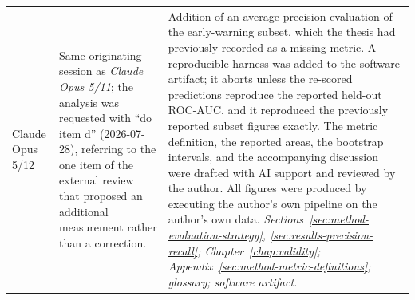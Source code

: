 {\begin{longtable}{p{} p{} p{}}
Claude Opus 5/12
& Same originating session as \emph{Claude Opus 5/11}; the analysis was requested with
``do item d'' (2026-07-28), referring to the one item of the external review that
proposed an additional measurement rather than a correction.
& Addition of an average-precision evaluation of the early-warning subset, which the
thesis had previously recorded as a missing metric. A reproducible harness was added to
the software artifact; it aborts unless the re-scored predictions reproduce the reported
held-out ROC-AUC, and it reproduced the previously reported subset figures exactly. The
metric definition, the reported areas, the bootstrap intervals, and the accompanying
discussion were drafted with AI support and reviewed by the author. All figures were
produced by executing the author's own pipeline on the author's own data. \newline
\emph{Sections~\ref{sec:method-evaluation-strategy},
\ref{sec:results-precision-recall}; Chapter~\ref{chap:validity};
Appendix~\ref{sec:method-metric-definitions}; glossary; software artifact.} \\

\end{longtable}
}
